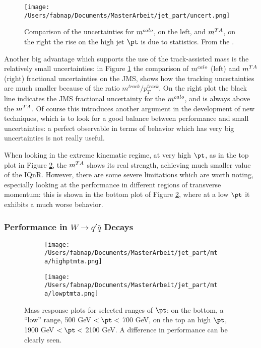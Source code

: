 \begin{figure}[!ht]
  \centering
      \texttt{[image: /Users/fabnap/Documents/MasterArbeit/jet\_part/uncert.png]}
  \caption[Comparison of the uncertainties for $\mcal$ and $\mta$]{Comparison of the uncertainties for $\mcal$, on the left, and $\mta$, on the right the rise on the high jet $\pt$ is due to statistics. From the \cite{art35}.}
  \label{fig:uncert}
\end{figure}

Another big advantage which supports the use of the track-assisted mass is the relatively small uncertainties: in Figure \ref{fig:uncert} the comparison of $\mcal$ (left) and $\mta$ (right) fractional uncertainties on the JMS, shows how the tracking uncertainties are much smaller because of the ratio $m^{track}/p_T^{track}$. On the right plot the black line indicates the JMS fractional uncertainty for the $\mcal$, and is always above the $\mta$. Of course this introduces another argument in the development of new techniques, which is to look for a good balance between performance and small uncertainties: a perfect observable in terms of behavior which has very big uncertainties is not really useful.


When looking in the extreme kinematic regime, at very high $\pt$, as in the top plot in Figure \ref{fig:mta2}, the $\mta$ shows its real strength, achieving much smaller value of the IQnR.
However, there are some severe limitations which are worth noting, especially looking at the performance in different regions of transverse momentum: this is shown in the bottom plot of Figure \ref{fig:mta2}, where at a low $\pt$ it exhibits a much worse behavior.

\subsubsection{Performance in $W \to q'\bar{q}$ Decays}

\begin{figure}
    \centering
    \begin{subfigure}[b]{0.5\textwidth}
	\centering
        \texttt{[image: /Users/fabnap/Documents/MasterArbeit/jet\_part/mta/highptmta.png]}
   
    \end{subfigure}
    \begin{subfigure}[b]{0.5\textwidth}
	\centering
        \texttt{[image: /Users/fabnap/Documents/MasterArbeit/jet\_part/mta/lowptmta.png]}
 
    \end{subfigure}
    \caption[Mass response plots for the $\mta$]{Mass response plots for selected ranges of $\pt$: on the bottom, a ``low'' range, 500 GeV $<\pt<$ 700 GeV, on the top an high $\pt$, 1900 GeV $<\pt<$ 2100 GeV. A difference in performance can be clearly seen.} 
    \label{fig:mta2}
\end{figure}


